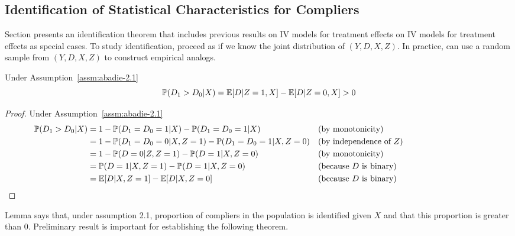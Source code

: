 \subsection{Identification of Statistical Characteristics for Compliers}

Section presents an identification theorem that includes previous results on IV models for treatment effects on IV models for treatment effects as special cases. To study identification, proceed as if we know the joint distribution of $(Y,D,X,Z)$. In practice, can use a random sample from $(Y,D,X,Z)$ to construct empirical analogs.

\begin{lemma}
	\label{lemma:abadie-2.1}
	Under Assumption~\ref{assm:abadie-2.1}
	\[\mathbb{P}(D_1 > D_0|X) = \mathbb{E}[D|Z=1,X] - \mathbb{E}[D|Z=0,X] > 0\]
\end{lemma}
\begin{proof}
	Under Assumption~\ref{assm:abadie-2.1} 
	\begin{align*}
		\P(D_1 > D_0 | X) &= 1 - \P(D_1 = D_0 = 1| X) - \P(D_1 = D_0 = 1| X) &\parbox[t]{20em}{(by monotonicity)} \\
						  &= 1 - \P(D_1 = D_0 = 0 | X, Z = 1) - \P(D_1 = D_0 = 1 | X, Z=0) &\parbox[t]{20em}{(by independence of $Z$)} \\ 
						  &= 1 - \P(D=0|Z,Z= 1) - \P(D=1|X,Z=0) &\parbox[t]{20em}{(by monotonicity)} \\
						  &= \P(D= 1|X,Z=1) - \P(D=1|X,Z=0) &\parbox[t]{20em}{(because $D$ is binary)} \\
						  &= \E[D | X, Z= 1] - \E[D|X,Z=0] &\parbox[t]{20em}{(because $D$ is binary)}
	\end{align*}
\end{proof}
Lemma says that, under assumption 2.1, proportion of compliers in the population is identified given $X$ and that this proportion is greater than 0. Preliminary result is important for establishing the following theorem. 

